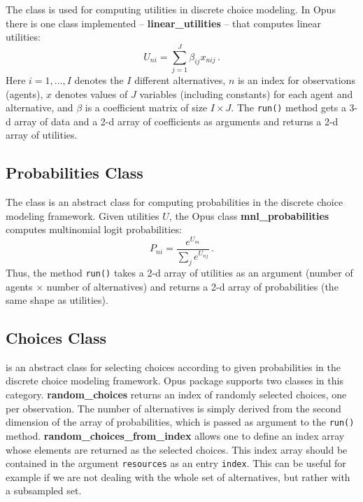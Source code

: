 {The  class is used for computing utilities in
discrete choice modeling. In Opus  there is one
 class implemented -- {\bf linear_utilities} --
that computes linear utilities:
\[
U_{ni} = \sum_{j=1}^J \beta_{ij}x_{nij}\,.
\]
Here $i=1,\dots,I$ denotes the $I$ different alternatives, $n$ is an index for
observations (agents), $x$ denotes values of $J$ variables (including
constants) for each agent and alternative, and $\beta$ is a coefficient \coefficientsindex matrix
of size $I\times J$. The \verb|run()| method gets a 3-d array of data and a
2-d array of coefficients \coefficientsindex as arguments and returns a 2-d array of utilities.

\subsection{Probabilities Class}
\label{sec:probabilities}

The  class is an abstract class for computing
probabilities in the discrete choice modeling framework. Given
utilities $U$, the Opus  class {\bf
mnl_probabilities} computes multinomial logit probabilities:
\[
P_{ni} = \frac{e^{U_{ni}}}{\sum_{j} e^{U_{nj}}}\,.
\]
Thus, the method \verb|run()| takes a 2-d array of utilities as an argument
(number of agents $\times$ number of alternatives) and returns a 2-d array of
probabilities (the same shape as utilities).

\subsection{Choices Class}
\label{sec:choices}

 is an abstract class for selecting choices according to given
probabilities in the discrete choice modeling framework. Opus package  supports
two classes in this category. {\bf random_choices} returns an index of
randomly selected choices, one per observation. The number of alternatives is
simply derived from the second dimension of the array of probabilities, which
is passed as argument to the \verb|run()| method. {\bf
  random_choices_from_index} allows one to define an index array whose
elements are returned as the selected choices. This index array should be
contained in the argument \verb|resources| as an entry \verb|index|. This can be
useful for example if we are not dealing with the whole set of alternatives,
but rather with a subsampled set.

}
